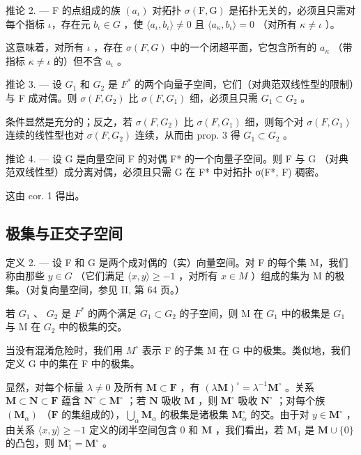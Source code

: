 推论 2. --- F 的点组成的族 \((a_{\iota})\) 对拓扑 \(\sigma(\mathrm{F}, \mathrm{G})\) 是拓扑无关的，必须且只需对每个指标 \(\iota\)，存在元 \(b_{\iota} \in G\) ，使 \(\langle a_{\iota}, b_{\iota} \rangle \neq 0\) 且 \(\langle a_{\kappa}, b_{\iota} \rangle = 0\) （对所有 \(\kappa \neq \iota\) ）。

这意味着，对所有 \(\iota\) ，存在 \(\sigma(F, G)\) 中的一个闭超平面，它包含所有的 \(a_{\kappa}\) （带指标 \(\kappa \neq \iota\) 的）但不含 \(a_{\iota}\) 。

推论 3. --- 设 \(G_{1}\) 和 \(G_{2}\) 是 \(F^{*}\) 的两个向量子空间，它们（对典范双线性型的限制）与 F 成对偶。则 \(\sigma(F, G_{2})\) 比 \(\sigma(F, G_{1})\) 细，必须且只需 \(G_{1} \subset G_{2}\) 。

条件显然是充分的；反之，若 \(\sigma(F, G_2)\) 比 \(\sigma(F, G_1)\) 细，则每个对 \(\sigma(F, G_1)\) 连续的线性型也对 \(\sigma(F, G_2)\) 连续，从而由 prop. 3 得 \(G_1 \subset G_2\) 。

推论 4. --- 设 G 是向量空间 F 的对偶 F* 的一个向量子空间。则 F 与 G （对典范双线性型）成分离对偶，必须且只需 G 在 F* 中对拓扑 σ(F*, F) 稠密。

这由 cor. 1 得出。

\subsection{极集与正交子空间}

定义 2. --- 设 F 和 G 是两个成对偶的（实）向量空间。对 F 的每个集 M，我们称由那些 \(y \in G\) （它们满足 \(\langle x, y \rangle \geqslant -1\) ，对所有 \(x \in M\) ）组成的集为 M 的极集。（对复向量空间，参见 II, 第 64 页。）

若 \(G_{1}\) 、 \(G_{2}\) 是 \(F^{*}\) 的两个满足 \(G_{1} \subset G_{2}\) 的子空间，则 M 在 \(G_{1}\) 中的极集是 \(G_{1}\) 与 M 在 \(G_{2}\) 中的极集的交。

当没有混淆危险时，我们用 \(M^{\circ}\) 表示 F 的子集 M 在 G 中的极集。类似地，我们定义 G 中的集在 F 中的极集。

显然，对每个标量 \(\lambda \neq 0\) 及所有 \(\mathbf{M} \subset \mathbf{F}\) ，有 \((\lambda \mathbf{M})^{\circ} = \lambda^{-1} \mathbf{M}^{\circ}\) 。关系 \(\mathbf{M} \subset \mathbf{N} \subset \mathbf{F}\) 蕴含 \(\mathbf{N}^{\circ} \subset \mathbf{M}^{\circ}\) ；若 \(\mathbf{N}\) 吸收 \(\mathbf{M}\) ，则 \(\mathbf{M}^{\circ}\) 吸收 \(\mathbf{N}^{\circ}\) ；对每个族 \((\mathbf{M}_{\alpha})\) （\(\mathbf{F}\) 的集组成的），\(\bigcup_{\alpha} \mathbf{M}_{\alpha}\) 的极集是诸极集 \(\mathbf{M}_{\alpha}^{\circ}\) 的交。由于对 \(y \in \mathbf{M}^{\circ}\) ，由关系 \(\langle x, y \rangle \geqslant -1\) 定义的闭半空间包含 0 和 \(\mathbf{M}\) ，我们看出，若 \(\mathbf{M}_{1}\) 是 \(\mathbf{M} \cup \{0\}\) 的凸包，则 \(\mathbf{M}_{1}^{\circ} = \mathbf{M}^{\circ}\) 。

